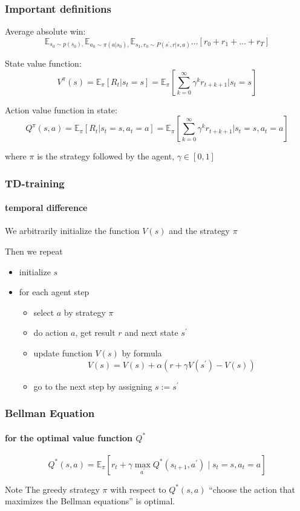 \documentclass[fullscreen=true, bookmarks=true, hyperref={pdfencoding=unicode}]{beamer}
\begin{document}
\begin{frame}
  \frametitle{Important definitions}
    Average absolute win:
    $$ \mathbb{E}_{s_0 \sim p(s_0),} \mathbb{E}_{a_0 \sim \pi(a|s_0),} \mathbb{E}_{s_1, r_0 \sim P (s^\prime,r|s, a)} \dots \left[r_0 + r_1 + \dots + r_T \right]$$

    State value function:
    $$ V^{\pi} (s) = \mathbb{E}_\pi [R_t|s_t = s] =
    \mathbb{E}_\pi \left[\sum\limits_{k=0}^\infty \gamma^k r_{t+k+1} | s_t = s\right]$$

    Action value function in state:
    $$ Q^{\pi} (s, a) = \mathbb{E}_\pi [R_t|s_t = s, a_t = a] =
    \mathbb{E}_\pi \left[\sum\limits_{k=0}^\infty \gamma^k r_{t+k+1} | s_t = s, a_t = a \right]$$

    where $\pi$ is the strategy followed by the agent, $\gamma \in [0, 1]$
\end{frame}


\begin{frame}
  \frametitle{TD-training}
    \framesubtitle{temporal difference}

    We arbitrarily initialize the function $V(s)$ and the strategy $\pi$

    Then we repeat
    \begin{itemize}
      \item initialize $s$
      \item for each agent step
        \begin{itemize}
          \item select $a$ by strategy $\pi$
          \item do action $a$, get result $r$ and next state $s^\prime$
          \item update function $V(s)$ by formula
          $$ V(s) = V(s) + \alpha \left(r + \gamma V(s^\prime) - V(s) \right)$$
          \item go to the next step by assigning $s := s^\prime$
        \end{itemize}
    \end{itemize}
\end{frame}



\begin{frame}
  \frametitle{Bellman Equation}
    \framesubtitle{for the optimal value function $Q^*$}

    $$ Q^* (s,a) = \mathbb{E}_\pi \left[r_t + \gamma \max\limits_{a^\prime} Q^* (s_{t+1},a^\prime) \mid s_t = s, a_t = a \right]$$

    \vspace{1cm}
    \begin{block}{Note}
      The greedy strategy $\pi$ with respect to $Q^*(s,a)$ ``choose the action that maximizes the Bellman equations'' is optimal.
    \end{block}
\end{frame}
\end{document}
